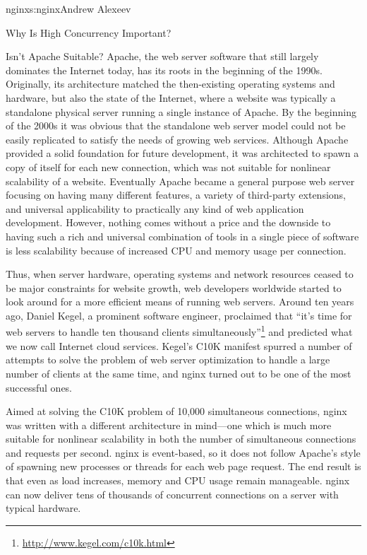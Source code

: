 \begin{aosachapter}{nginx}{s:nginx}{Andrew Alexeev}
\begin{aosasect1}{Why Is High Concurrency Important?}
\begin{aosasect2}{Isn't Apache Suitable?}
Apache, the web server software that still largely dominates the
Internet today, has its roots in the beginning of the
1990s. Originally, its architecture matched the then-existing
operating systems and hardware, but also the state of the 
Internet, where a website was typically a standalone physical server
running a single instance of Apache. By the beginning of the 2000s it
was obvious that the standalone web server model could not be easily
replicated to satisfy the needs of growing web services. Although
Apache provided a solid foundation for future development, it was
architected to spawn a copy of itself for each new connection, which
was not suitable for nonlinear scalability of a website. Eventually
Apache became a general purpose web server focusing on having many
different features, a variety of third-party extensions, and universal
applicability to practically any kind of web application
development. However, nothing comes without a price and the downside
to having such a rich and universal combination of tools in a single
piece of software is less scalability because of increased CPU and
memory usage per connection.

Thus, when server hardware, operating systems and network resources
ceased to be major constraints for website growth, web developers
worldwide started to look around for a more efficient means of running
web servers. Around ten years ago, Daniel Kegel, a prominent software
engineer, proclaimed that ``it's time for web servers to handle ten
thousand clients simultaneously''\footnote{
\url{http://www.kegel.com/c10k.html}} and predicted what we
now call Internet cloud services. Kegel's C10K manifest spurred a
number of attempts to solve the problem of web server optimization to
handle a large number of clients at the same time, and nginx turned
out to be one of the most successful ones.

Aimed at solving the C10K problem of 10,000 simultaneous connections,
nginx was written with a different architecture in mind---one which is
much more suitable for nonlinear scalability in both the number of
simultaneous connections and requests per second. nginx is
event-based, so it does not follow Apache's style of spawning new
processes or threads for each web page request. The end result is that
even as load increases, memory and CPU usage remain manageable. nginx
can now deliver tens of thousands of concurrent connections on a
server with typical hardware.


\end{aosasect2}
\end{aosasect1}
\end{aosachapter}
